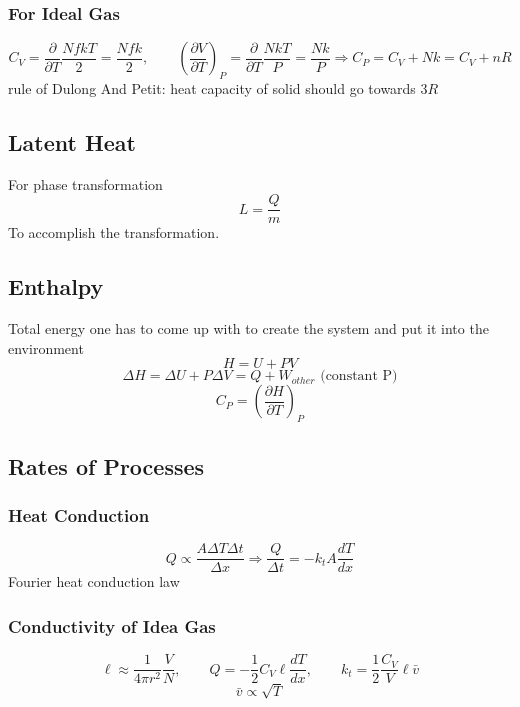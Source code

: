 \documentclass[a4paper,norsk, 10pt]{article}
\begin{document}
\subsubsection{For Ideal Gas}
\begin{equation}
C_V = \frac{\partial}{\partial T }\frac{NfkT}{2} = \frac{Nfk}{2}, \qquad \left(\frac{\partial V}{\partial T}\right)_P = \frac{\partial}{\partial T }\frac{NkT}{P} = \frac{Nk}{P} \Rightarrow C_P = C_V + Nk = C_V + nR
\end{equation}
rule of Dulong And Petit: heat capacity of solid should go towards $3R$

\subsection{Latent Heat}
For phase transformation
\begin{equation}
L = \frac{Q}{m}
\end{equation}
To accomplish the transformation.
\subsection{Enthalpy}
Total energy one has to come up with to create the system and put it into the environment 
\begin{equation}
H = U + PV
\end{equation}
\begin{equation}
\Delta H = \Delta U + P\Delta V = Q +W_{other} \text{ (constant P)}
\end{equation}
\begin{equation}
C_P = \left(\frac{\partial H}{\partial T}\right)_P
\end{equation}

\subsection{Rates of Processes}
\subsubsection{Heat Conduction}
\begin{equation}
Q \propto \frac{A\Delta T\Delta t}{\Delta x} \Rightarrow \frac{Q}{\Delta t} = -k_t A \frac{dT}{dx}
\end{equation}
Fourier heat conduction law
\subsubsection{Conductivity of Idea Gas}
\begin{equation}
\ell \approx \frac{1}{4\pi r^2}\frac{V}{N},\qquad Q = -\frac{1}{2}C_V\ell \frac{dT}{dx}, \qquad k_t = \frac{1}{2}\frac{C_V}{V}\ell \bar{v}
\end{equation}
\begin{equation}
\bar{v}\propto \sqrt{T}
\end{equation}
\end{document}
